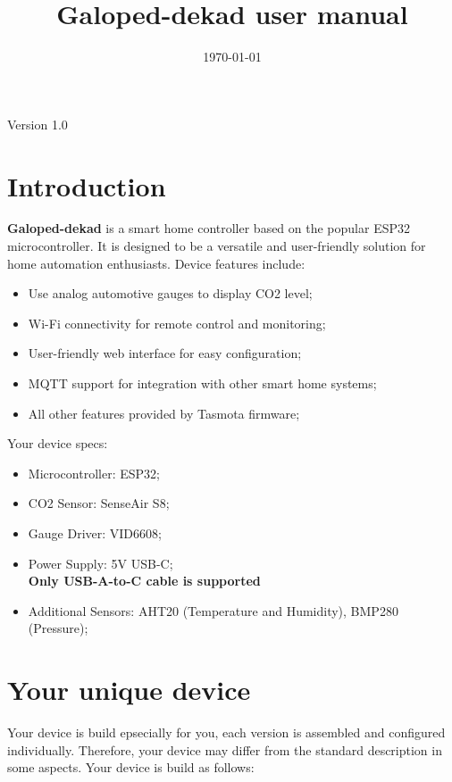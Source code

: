 \documentclass[11pt,a5paper]{article}
\title{Galoped-dekad user manual}
\date{\today}
\begin{document}
\maketitle

\bigskip
\small{Version 1.0}

\newpage

\newpage

\section{Introduction}

\textbf{Galoped-dekad} is a smart home controller based on the popular ESP32
microcontroller. It is designed to be a versatile and user-friendly solution for
home automation enthusiasts. Device features include:

\begin{itemize}
\item Use analog automotive gauges to display CO2 level;
\item Wi-Fi connectivity for remote control and monitoring;
\item User-friendly web interface for easy configuration;
\item MQTT support for integration with other smart home systems;
\item All other features provided by Tasmota firmware;
\end{itemize}

Your device specs:

\begin{itemize}
\item Microcontroller: ESP32;
\item CO2 Sensor: SenseAir S8;
\item Gauge Driver: VID6608;
\item Power Supply: 5V USB-C; \\ \textbf{Only USB-A-to-C cable is supported}
\item Additional Sensors: AHT20 (Temperature and Humidity), BMP280 (Pressure);
\end{itemize}

\newpage

\section{Your unique device}

Your device is build epsecially for you, each version is assembled and configured
individually. Therefore, your device may differ from the standard description in
some aspects. Your device is build as follows:
\end{document}
